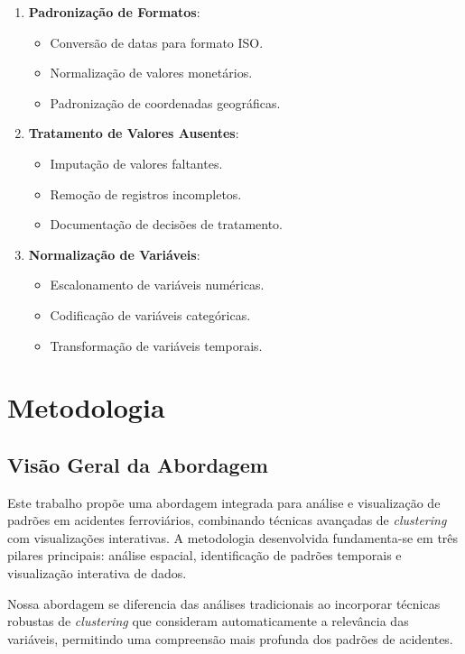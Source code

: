 \documentclass[conference]{IEEEtran}
\begin{document}
\begin{enumerate}
\item \textbf{Padronização de Formatos}:
   \begin{itemize}
   \item Conversão de datas para formato ISO.
   \item Normalização de valores monetários.
   \item Padronização de coordenadas geográficas.
   \end{itemize}

\item \textbf{Tratamento de Valores Ausentes}:
   \begin{itemize}
   \item Imputação de valores faltantes.
   \item Remoção de registros incompletos.
   \item Documentação de decisões de tratamento.
   \end{itemize}

\item \textbf{Normalização de Variáveis}:
   \begin{itemize}
   \item Escalonamento de variáveis numéricas.
   \item Codificação de variáveis categóricas.
   \item Transformação de variáveis temporais.
   \end{itemize}
\end{enumerate}

\section{Metodologia}

\subsection{Visão Geral da Abordagem}
Este trabalho propõe uma abordagem integrada para análise e visualização de padrões em acidentes ferroviários, combinando técnicas avançadas de \textit{clustering} com visualizações interativas. A metodologia desenvolvida fundamenta-se em três pilares principais: análise espacial, identificação de padrões temporais e visualização interativa de dados.

Nossa abordagem se diferencia das análises tradicionais ao incorporar técnicas robustas de \textit{clustering} que consideram automaticamente a relevância das variáveis, permitindo uma compreensão mais profunda dos padrões de acidentes. 
\end{document}

